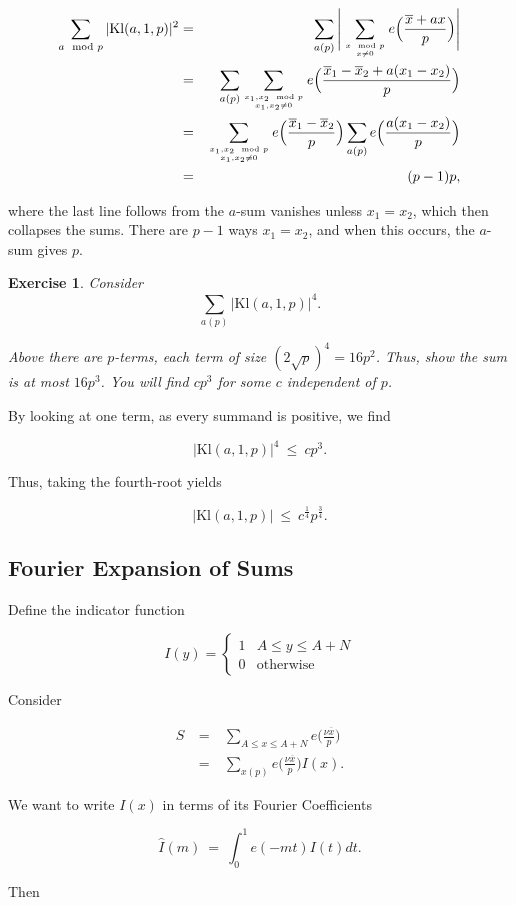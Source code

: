 \documentclass[12pt,letterpaper]{report}
\newcommand\be{\begin{equation}}
\newcommand\ee{\end{equation}}
\newcommand\bea{\begin{eqnarray}}
\newcommand\eea{\end{eqnarray}}
\newtheorem{exe}[thm]{Exercise}
\newcommand{\twocase}[5]{#1 \begin{cases} #2 & \text{#3}\\ #4
&\text{#5} \end{cases}   }
\begin{document}
\bea \sum_{a \mod p} |\text{Kl}(a,1,p)|^2 &=& \sum_{a (p)} \Bigg|
\sum_{ {x \mod p \atop x \neq 0} } e\Big( \frac{\overline{x} +
ax}{p} \Big) \Bigg| \nonumber\\ &=& \sum_{a (p)} \sum_{ {x_1,x_2
\mod p \atop x_1,x_2 \neq 0} } e\Big( \frac{\overline{x}_1 -
\overline{x}_2 + a(x_1 - x_2)}{p} \Big) \nonumber\\ &=& \sum_{
{x_1,x_2 \mod p \atop x_1,x_2 \neq 0} } e\Big(
\frac{\overline{x}_1 - \overline{x}_2 }{p} \Big) \sum_{a (p)}
e\Big( \frac{ a(x_1 - x_2)}{p} \Big) \nonumber\\ &=& (p-1)p, \eea

where the last line follows from the $a$-sum vanishes unless $x_1
= x_2$, which then collapses the sums. There are $p-1$ ways $x_1 =
x_2$, and when this occurs, the $a$-sum gives $p$.

\begin{exe} Consider
\be \sum_{a (p)} |\text{Kl}(a,1,p)|^4. \ee

Above there are $p$-terms, each term of size $(2\sqrt{p})^4 =
16p^2$. Thus, show the sum is at most $16p^3$. You will find
$cp^3$ for some $c$ independent of $p$.
\end{exe}

By looking at one term, as every summand is positive, we find

\be |\text{Kl}(a,1,p)|^4 \ \le \ c p^3. \ee

Thus, taking the fourth-root yields

\be |\text{Kl}(a,1,p)| \ \le \ c^{\frac{1}{4}} p^{\frac{3}{4}}.
\ee


\subsection{Fourier Expansion of Sums}

Define the indicator function

\be \twocase{I(y) =}{1}{$A \le y \le A+N$}{0}{otherwise} \ee

Consider

\bea S & \ = \ & \sum_{A \le x \le A+N} e\Big( \frac{\nu
\overline{x}}{p} \Big) \nonumber\\ & \ = \ & \sum_{x (p)} e\Big(
\frac{\nu \overline{x} }{p}\Big) I(x).  \eea

We want to write $I(x)$ in terms of its Fourier Coefficients

\be \widehat{I}(m) \ = \ \int_0^1 e(-mt)I(t)dt. \ee

Then
\end{document}
